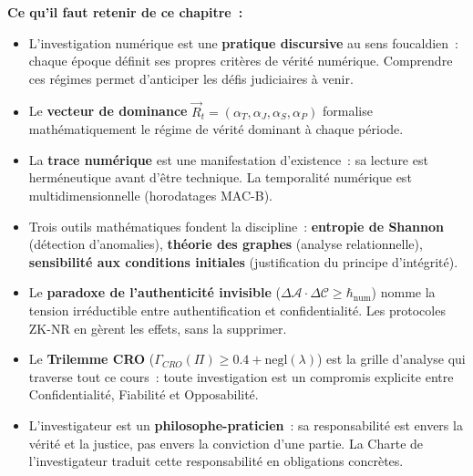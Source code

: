 \begin{boxresume}
\textbf{Ce qu'il faut retenir de ce chapitre~:}

\begin{itemize}
    \item L'investigation numérique est une \textbf{pratique discursive}
          au sens foucaldien~: chaque époque définit ses propres critères
          de vérité numérique. Comprendre ces régimes permet d'anticiper
          les défis judiciaires à venir.

    \item Le \textbf{vecteur de dominance} $\vec{R}_t = (\alpha_T, \alpha_J,
          \alpha_S, \alpha_P)$ formalise mathématiquement le régime de vérité
          dominant à chaque période.

    \item La \textbf{trace numérique} est une manifestation d'existence~:
          sa lecture est herméneutique avant d'être technique. La temporalité
          numérique est multidimensionnelle (horodatages MAC-B).

    \item Trois outils mathématiques fondent la discipline~:
          \textbf{entropie de Shannon} (détection d'anomalies),
          \textbf{théorie des graphes} (analyse relationnelle),
          \textbf{sensibilité aux conditions initiales} (justification
          du principe d'intégrité).

    \item Le \textbf{paradoxe de l'authenticité invisible}
          ($\Delta\mathcal{A} \cdot \Delta\mathcal{C} \geq \hbar_{\mathrm{num}}$)
          nomme la tension irréductible entre authentification et
          confidentialité. Les protocoles ZK-NR en gèrent les effets,
          sans la supprimer.

    \item Le \textbf{Trilemme CRO} ($\Gamma_{CRO}(\Pi) \geq 0.4 +
          \mathrm{negl}(\lambda)$) est la grille d'analyse qui traverse
          tout ce cours~: toute investigation est un compromis explicite
          entre Confidentialité, Fiabilité et Opposabilité.

    \item L'investigateur est un \textbf{philosophe-praticien}~: sa
          responsabilité est envers la vérité et la justice, pas envers
          la conviction d'une partie. La Charte de l'investigateur
          traduit cette responsabilité en obligations concrètes.
\end{itemize}
\end{boxresume}

